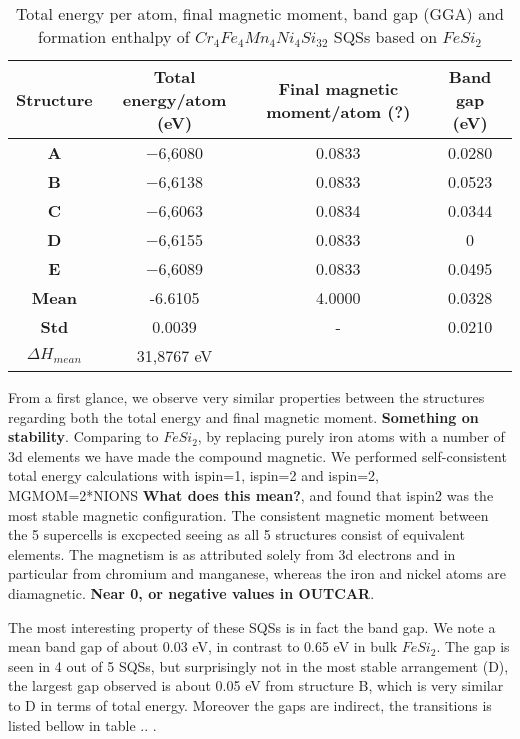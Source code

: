 \begin{table}[H]
\centering
\begin{tabular}{@{}cccc@{}}
\toprule
Structure  & Total energy/atom (eV) & Final magnetic moment/atom (?) & Band gap (eV) \\ \midrule
\textbf{A} & −6,6080                & 0.0833                    & 0.0280        \\
\textbf{B} & −6,6138                & 0.0833                    & 0.0523        \\
\textbf{C} & −6,6063                & 0.0834                    & 0.0344        \\
\textbf{D} & −6,6155                & 0.0833                    & 0             \\
\textbf{E} & −6,6089                & 0.0833                    & 0.0495        \\ \midrule
\textbf{Mean} & -6.6105 & 4.0000 & 0.0328    \\
\textbf{Std} & 0.0039 &  - &  0.0210 \\
\textbf{$\Delta H_{mean}$} & 31,8767 eV \\ \bottomrule
\end{tabular}
\caption{Total energy per atom, final magnetic moment, band gap (GGA) and formation enthalpy of $Cr_4Fe_4Mn_4Ni_4Si_{32}$ SQSs based on $FeSi_2$}
\label{table:fesi2_summary}
\end{table}  

From a first glance, we observe very similar properties between the structures regarding both the total energy and final magnetic moment. \textbf{Something on stability}. Comparing to $FeSi_2$, by replacing purely iron atoms with a number of 3d elements we have made the compound magnetic. We performed self-consistent total energy calculations with ispin=1, ispin=2 and ispin=2, MGMOM=2*NIONS \textbf{What does this mean?}, and found that ispin2 was the most stable magnetic configuration. The consistent magnetic moment between the 5 supercells is excpected seeing as all 5 structures consist of equivalent elements. The magnetism is as attributed solely from 3d electrons and in particular from chromium and manganese, whereas the iron and nickel atoms are diamagnetic. \textbf{Near 0, or negative values in OUTCAR}. 
 
The most interesting property of these SQSs is in fact the band gap. We note a mean band gap of about 0.03 eV, in contrast to 0.65 eV in bulk $FeSi_2$. The gap is seen in 4 out of 5 SQSs, but surprisingly not in the most stable arrangement (D), the largest gap observed is about 0.05 eV from structure B, which is very similar to D in terms of total energy. Moreover the gaps are indirect, the transitions is listed bellow in table .. .     

